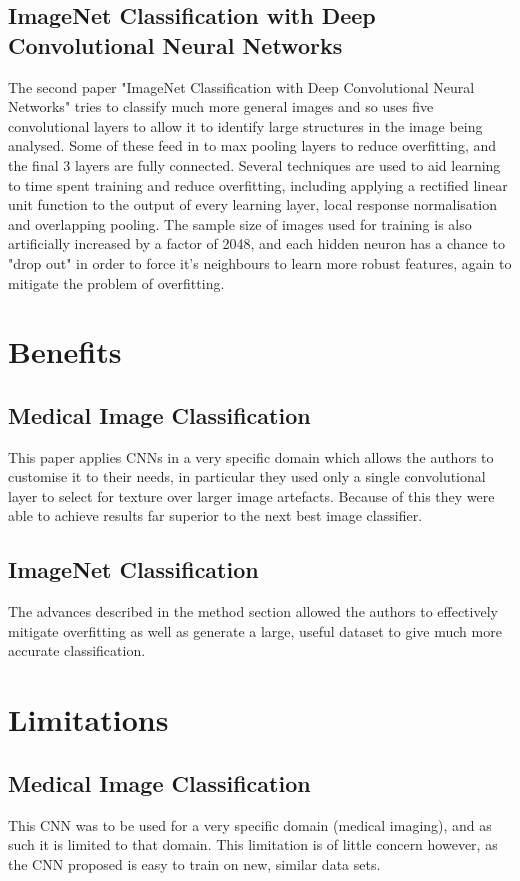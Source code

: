 \documentclass{article}
\begin{document}
\subsection{ImageNet Classification with Deep Convolutional Neural Networks}
The second paper "ImageNet Classification with Deep Convolutional Neural Networks" tries to classify much more general images and so uses five convolutional layers to allow it to identify large structures in the image being analysed\cite{imagenet}. Some of these feed in to max pooling layers to reduce overfitting, and the final 3 layers are fully connected. Several techniques are used to aid learning to time spent training and reduce overfitting, including applying a rectified linear unit function to the output of every learning layer, local response normalisation and overlapping pooling. The sample size of images used for training is also artificially increased by a factor of 2048, and each hidden neuron has a chance to "drop out" in order to force it's neighbours to learn more robust features, again to mitigate the problem of overfitting. 

\section{Benefits}
\subsection{Medical Image Classification}
This paper applies CNNs in a very specific domain which allows the authors to customise it to their needs, in particular they used only a single convolutional layer to select for texture over larger image artefacts. Because of this they were able to achieve results far superior to the next best image classifier\cite{medical}.

\subsection{ImageNet Classification}
The advances described in the method section allowed the authors to effectively mitigate overfitting as well as generate a large, useful dataset to give much more accurate classification.

\section{Limitations}
\subsection{Medical Image Classification}
This CNN was to be used for a very specific domain (medical imaging), and as such it is limited to that domain. This limitation is of little concern however, as the CNN proposed is easy to train on new, similar data sets.
\end{document}
